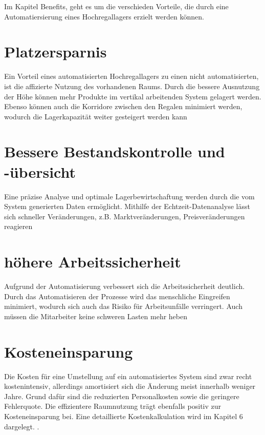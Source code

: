 Im Kapitel Benefits, geht es um die verschieden Vorteile, die durch eine Automatiersierung eines Hochregallagers erzielt werden können.

	\section{Platzersparnis} %
	Ein Vorteil eines automatisierten Hochregallagers zu einen nicht automatisierten, ist die affizierte Nutzung des vorhandenen Raums. Durch die bessere Ausnutzung der Höhe können mehr Produkte im vertikal arbeitenden System gelagert werden. Ebenso können auch die Korridore zwischen den Regalen minimiert werden, wodurch die Lagerkapazität weiter gesteigert werden kann
	\section{Bessere Bestandskontrolle und -übersicht}
	Eine präzise Analyse und optimale Lagerbewirtschaftung werden durch die vom System generierten Daten ermöglicht. Mithilfe der Echtzeit-Datenanalyse lässt sich schneller Veränderungen, z.B. Marktveränderungen, Preisveränderungen reagieren %
	\section{höhere Arbeitssicherheit}
	Aufgrund der Automatisierung verbessert sich die Arbeitssicherheit deutlich. Durch das Automatisieren der Prozesse wird das menschliche Eingreifen minimiert, wodurch sich auch das Risiko für Arbeitsunfälle verringert. Auch müssen die Mitarbeiter keine schweren Lasten mehr heben %
	\section{Kosteneinsparung}

	Die Kosten für eine Umstellung auf ein automatisiertes System sind zwar recht kostenintensiv, allerdings amortisiert sich die Änderung meist innerhalb weniger Jahre. Grund dafür sind die reduzierten Personalkosten sowie die geringere Fehlerquote. Die effizientere Raumnutzung trägt ebenfalls positiv zur Kosteneinsparung bei. Eine detaillierte Kostenkalkulation wird im Kapitel 6 dargelegt.
	\autocite{mueller2023}.
	
